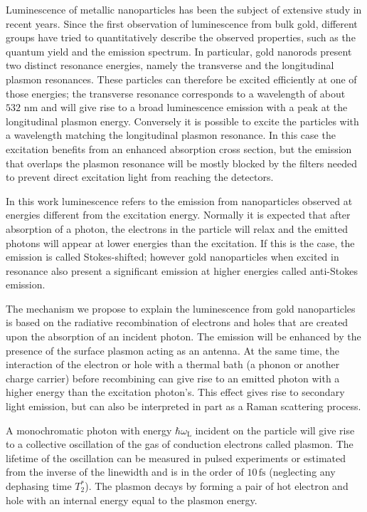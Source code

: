 \documentclass[journal=nalefd,manuscript=letter]{achemso}
\newcommand{\nm}{\ensuremath{\,\textrm{nm}}}
\newcommand{\fs}{\ensuremath{\,\textrm{fs}}}
\begin{document}
Luminescence of metallic nanoparticles has been the subject of extensive study in
recent years. Since the first observation of luminescence from bulk
gold\cite{Mooradian1969}, different groups have tried to quantitatively describe
the observed properties\cite{Mohamed2000,Beversluis2003a}, such as the quantum
yield\cite{Fang2012,Rao2015,Yorulmaz2012,Cheng2015,Dulkeith2004} and the
emission spectrum\cite{Link2010}. In particular, gold nanorods present two distinct
resonance energies, namely the transverse and the longitudinal plasmon
resonances. These particles can therefore be excited efficiently at one of those
energies; the transverse resonance corresponds to a wavelength of about $532\,\nm$ and will give
rise to a broad luminescence emission with a peak at the longitudinal plasmon energy.
Conversely it is possible to excite the particles with a wavelength matching
the longitudinal plasmon resonance. In this case the excitation benefits from
an enhanced absorption cross section, but the emission that overlaps the plasmon
resonance will be mostly blocked by the filters needed to prevent direct
excitation light from reaching the detectors.

In this work luminescence refers to the emission from nanoparticles observed at
energies different from the excitation energy. Normally it is expected that
after absorption of a photon, the electrons in the particle will relax and the
emitted photons will appear at lower energies than the excitation. If this is the
case, the emission is called Stokes-shifted; however gold nanoparticles when
excited in resonance also present a significant emission at higher energies
called anti-Stokes emission\cite{Jiang2013,He2015,Carattino2016a}.

The mechanism we propose to explain the luminescence from gold nanoparticles is
based on the radiative recombination of electrons and holes that are created
upon the absorption of an incident photon\cite{Dulkeith2004,Mooradian1969}. The
emission will be enhanced by the presence of the surface plasmon acting as an
antenna\cite{Mohamed2000}. At the same time, the interaction
of the electron or hole with a thermal bath (a phonon or another charge carrier) before
recombining can give rise to an emitted photon with a higher energy than the
excitation photon's\cite{Hodak2000,Giri2015,Arbouet2003a}. This effect gives rise
to secondary light emission, but can also be interpreted in part as a Raman scattering
process.\cite{Huang2014}

A monochromatic photon with energy $\hbar\omega_\textrm{L}$ incident on the
particle will give rise to a collective oscillation of the gas of conduction
electrons called plasmon. The lifetime of the oscillation can be measured in
pulsed experiments or estimated from the inverse of the linewidth and is in the
order of $10\fs$\cite{Sonnichsen2002} (neglecting any dephasing time $T_2^*$).
The plasmon decays by forming a pair of hot electron and hole with an internal energy equal to the plasmon
energy\cite{Sundararaman2014,Brongersma2015,AlejandroManjavacasJunG.LiuVikramKulkarni2014}.
\end{document}
